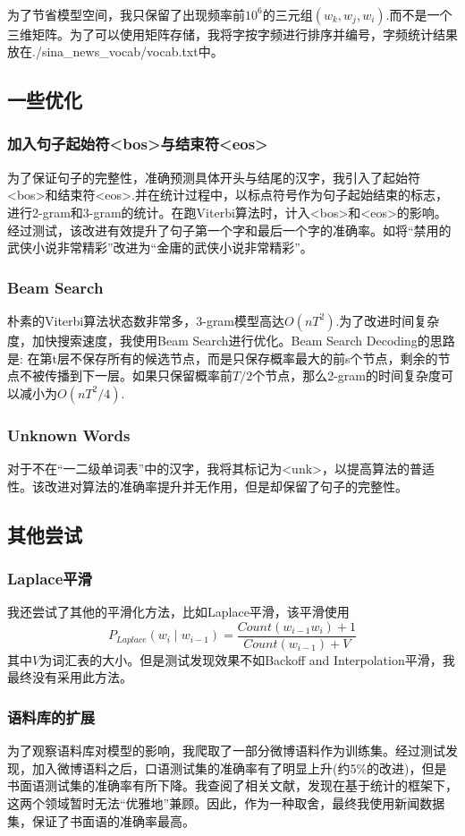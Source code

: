 \documentclass[UTF8, onecolumn, a4paper]{article}
\begin{document}
\paragraph*{}
为了节省模型空间，我只保留了出现频率前$10^6$的三元组$(w_k, w_j, w_i)$.而不是一个三维矩阵。为了可以使用矩阵存储，我将字按字频进行排序并编号，字频统计结果放在./sina\_news\_vocab/vocab.txt中。
\subsection{一些优化}
\subsubsection{加入句子起始符<bos>与结束符<eos>}
为了保证句子的完整性，准确预测具体开头与结尾的汉字，我引入了起始符<bos>和结束符<eos>.并在统计过程中，以标点符号作为句子起始结束的标志，进行2-gram和3-gram的统计。在跑Viterbi算法时，计入<bos>和<eos>的影响。经过测试，该改进有效提升了句子第一个字和最后一个字的准确率。如将“禁用的武侠小说非常精彩”改进为“金庸的武侠小说非常精彩”。
\subsubsection{Beam Search}
朴素的Viterbi算法状态数非常多，3-gram模型高达$O(nT^2)$.为了改进时间复杂度，加快搜索速度，我使用Beam Search进行优化。Beam Search Decoding的思路是: 在第t层不保存所有的候选节点，而是只保存概率最大的前s个节点，剩余的节点不被传播到下一层。如果只保留概率前$T/2$个节点，那么2-gram的时间复杂度可以减小为$O(nT^2/4)$.
\subsubsection{Unknown Words}
对于不在“一二级单词表”中的汉字，我将其标记为<unk>，以提高算法的普适性。该改进对算法的准确率提升并无作用，但是却保留了句子的完整性。
\subsection{其他尝试}
\subsubsection{Laplace平滑}
我还尝试了其他的平滑化方法，比如Laplace平滑，该平滑使用
$$P_{Laplace}(w_i\mid w_{i-1}) = \frac{Count(w_{i-1}w_i) + 1}{Count(w_{i-1})+V}$$
其中$V$为词汇表的大小。但是测试发现效果不如Backoff and Interpolation平滑，我最终没有采用此方法。
\subsubsection{语料库的扩展}
为了观察语料库对模型的影响，我爬取了一部分微博语料作为训练集。经过测试发现，加入微博语料之后，口语测试集的准确率有了明显上升(约5\%的改进)，但是书面语测试集的准确率有所下降。我查阅了相关文献，发现在基于统计的框架下，这两个领域暂时无法“优雅地”兼顾。因此，作为一种取舍，最终我使用新闻数据集，保证了书面语的准确率最高。
\end{document}
